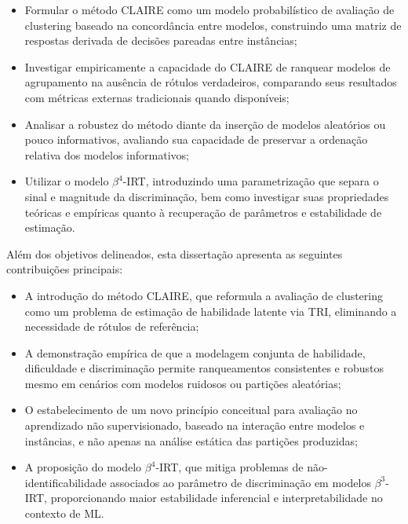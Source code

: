 \begin{itemize}
    \item Formular o método \gls{CLAIRE} como um modelo probabilístico de avaliação de clustering baseado na concordância entre modelos, construindo uma matriz de respostas derivada de decisões pareadas entre instâncias;

    \item Investigar empiricamente a capacidade do \gls{CLAIRE} de ranquear modelos de agrupamento na ausência de rótulos verdadeiros, comparando seus resultados com métricas externas tradicionais quando disponíveis;

    \item Analisar a robustez do método diante da inserção de modelos aleatórios ou pouco informativos, avaliando sua capacidade de preservar a ordenação relativa dos modelos informativos;

    \item Utilizar o modelo $\beta^4$-\gls{IRT}, introduzindo uma parametrização que separa o sinal e magnitude da discriminação, bem como investigar suas propriedades teóricas e empíricas quanto à recuperação de parâmetros e estabilidade de estimação.
\end{itemize}

Além dos objetivos delineados, esta dissertação apresenta as seguintes contribuições principais:

\begin{itemize}
    \item A introdução do método \gls{CLAIRE}, que reformula a avaliação de clustering como um problema de estimação de habilidade latente via \gls{TRI}, eliminando a necessidade de rótulos de referência;

    \item A demonstração empírica de que a modelagem conjunta de habilidade, dificuldade e discriminação permite ranqueamentos consistentes e robustos mesmo em cenários com modelos ruidosos ou partições aleatórias;

    \item O estabelecimento de um novo princípio conceitual para avaliação no aprendizado não supervisionado, baseado na interação entre modelos e instâncias, e não apenas na análise estática das partições produzidas;

    \item A proposição do modelo $\beta^4$-\gls{IRT}, que mitiga problemas de não-identificabilidade associados ao parâmetro de discriminação em modelos $\beta^3$-\gls{IRT}, proporcionando maior estabilidade inferencial e interpretabilidade no contexto de ML.
\end{itemize}